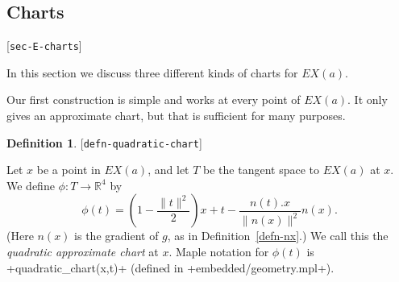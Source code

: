 \documentclass[reqno]{amsart}
\newcommand{\lbl}[1]{\label{#1}\textup{[\texttt{#1}]}\par}
\newcommand{\lbl}{\label}
\newcommand{\R}         {{\mathbb{R}}}
\renewcommand{\:}{\colon}
\theoremstyle{definition}
\newtheorem{definition}[theorem]{Definition}
\begin{document}
\subsection{Charts}
\lbl{sec-E-charts}

In this section we discuss three different kinds of charts for $EX(a)$.

Our first construction is simple and works at every point of $EX(a)$.  It
only gives an approximate chart, but that is sufficient for many
purposes.

\begin{definition}\lbl{defn-quadratic-chart}
 Let $x$ be a point in $EX(a)$, and let $T$ be the tangent space to
 $EX(a)$ at $x$.  We define $\phi\:T\to\R^4$ by
 \[ \phi(t) = \left(1 - \frac{\|t\|^2}{2}\right)x + t
               - \frac{n(t).x}{\|n(x)\|^2}n(x).
 \]
 (Here $n(x)$ is the gradient of $g$, as in Definition~\ref{defn-nx}.)
 We call this the \emph{quadratic approximate chart} at $x$.  Maple
 notation for $\phi(t)$ is \mcode+quadratic_chart(x,t)+ (defined in
 \fname+embedded/geometry.mpl+).
\end{definition}
\end{document}
